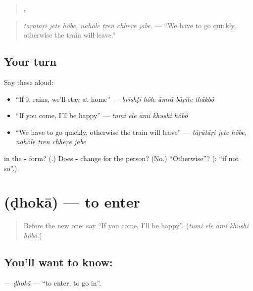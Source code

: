 \begin{quote}
\textbf{  ,    }
\end{quote}

\begin{quote}
\emph{tāṛātāṛi jete hôbe, nāhôle ṭren chheṛe jābe.} — \textquotedblleft{}We have to go quickly, otherwise the train will leave.\textquotedblright{}
\end{quote}

\subsection*{Your turn}
Say these aloud:

\begin{itemize}
\raggedright
  \item \textquotedblleft{}If it rains, we'll stay at home\textquotedblright{} — \emph{brishṭi hôle āmrā bāṛite thākbô}
  \item \textquotedblleft{}If you come, I'll be happy\textquotedblright{} — \emph{tumi ele āmi khushi hôbô}
  \item \textquotedblleft{}We have to go quickly, otherwise the train will leave\textquotedblright{} — \emph{tāṛātāṛi jete hôbe, nāhôle ṭren chheṛe jābe}
\end{itemize}

\begin{tcolorbox}[breakable,colback=teal!4,colframe=teal!35!black,title={Before you move on}]
\textbf{} in the \textbf{-} form? (\textbf{}.) Does \textbf{-} change for the person? (No.) \textquotedblleft{}Otherwise\textquotedblright{}? (\textbf{}: \textquotedblleft{}if not so\textquotedblright{}.)
\end{tcolorbox}
\section[\texorpdfstring{\bn{ঢোকা} (ḍhokā)}{ঢোকা (ḍhokā)}]{ (ḍhokā) — to enter}

\label{lesson:BN-C274-dhoka}



\begin{quote}
Before the new one: say \textquotedblleft{}If you come, I'll be happy\textquotedblright{}. (\emph{tumi ele āmi khushi hôbô}.)
\end{quote}

\subsection*{You'll want to know: }
\textbf{} — \emph{ḍhokā} — \textquotedblleft{}to enter, to go in\textquotedblright{}.

